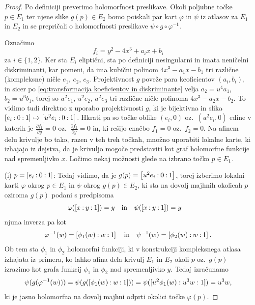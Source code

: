 \documentclass[mat1]{fmfdelo}
\numberwithin{equation}{section}
\newcommand{\inv}{^{-1}}
\newcommand{\pcoor}[1]{%
\begingroup\lccode`~=`: \lowercase{\endgroup
\edef~}{\mathbin{\mathchar\the\mathcode`:}\nobreak}%
\left[%
\begingroup
\mathcode`:=\string"8000
#1%
\endgroup
\right]%
}
\newcommand{\pdv}[2][]{\frac{\partial#1}{\partial#2}}
\newcommand{\oz}{oz.\ }
\theoremstyle{definition}
\begin{document}
\begin{proof}
    Po definiciji preverimo holomorfnost preslikave. Okoli poljubne točke $p \in E_1$ ter njene slike $g(p) \in E_2$ bomo poiskali par kart $\varphi$ in $\psi$ iz atlasov za $E_1$ in $E_2$ in se prepričali o holomorfnosti preslikave $\psi \circ g \circ \varphi\inv$. 
    
    Označimo 
    \[
        f_i = y^2 - 4x^3 + a_ix + b_i
    \]
    za $i \in \{1,2\}$.
    Ker sta $E_i$ eliptični, sta po definiciji nesingularni in imata neničelni diskriminanti, kar pomeni, da ima kubični polinom $4x^3 - a_1x - b_1$ tri različne (kompleksne) ničle $e_1$, $e_2$, $e_3$. Projektivnost $g$ poveže para keoficientov $(a_i, b_i)$, in sicer po \eqref{eq:transformacija koeficientov in diskriminante} velja $a_2 = u^4 a_1$, $b_2 = u^6 b_1$, torej so $u^2e_1$, $u^2e_2$, $u^2e_3$ tri različne ničle polinoma $4x^3 - a_2x - b_2$. To vidimo tudi direktno z uporabo projektivnosti $g$, ki je bijektivna in slika $\pcoor{e_i : 0 : 1} \mapsto \pcoor{u^2 e_i : 0 : 1}$. Hkrati pa so točke oblike $(e_i, 0)$ \oz $(u^2 e_i, 0)$ edine v katerih je $\pdv[f_1]{y} = 0$ \oz $\pdv[f_2]{y} = 0$ in, ki rešijo enačbo $f_1 = 0$ \oz $f_2 = 0$. Na afinem delu krivulje bo tako, razen v teh treh točkah, množno uporabiti lokalne karte, ki izhajajo iz dejstva, da je krivuljo mogoče predstaviti kot graf holomorfne funkcije nad spremenljivko $x$. Ločimo nekaj možnosti glede na izbrano točko $p \in E_1$.

        (i) $p = \pcoor{e_i : 0 : 1}$: Tedaj vidimo, da je $g(p) = \pcoor{u^2 e_i : 0 : 1}$, torej izberimo lokalni karti $\varphi$ okrog $p \in E_1$ in $\psi$ okrog $g(p) \in E_2$, ki sta na dovolj majhnih okolicah $p$ oziroma $g(p)$ podani s predpisoma 
        \[
            \varphi(\pcoor{x : y : 1}) = y \quad \text{in} \quad
            \psi(\pcoor{x : y : 1}) = y \quad  
        \] 
        njuna inverza pa kot 
        \[
            \varphi\inv(w) = \pcoor{\phi_1(w) : w : 1} \quad \text{in} \quad
            \psi\inv(w) = \pcoor{\phi_2(w) : w : 1}.
        \]
        Ob tem sta $\phi_1$ in $\phi_2$ holomorfni funkciji, ki v konstrukciji kompleksnega atlasa izhajata iz primera, ko lahko afina dela krivulj $E_1$ in $E_2$ okoli $p$ \oz $g(p)$ izrazimo kot grafa funkcij $\phi_1$ in $\phi_2$ nad spremenljivko $y$. Tedaj izračunamo
        \[
            \psi(g(\varphi\inv(w))) = 
            \psi(g(\pcoor{\phi_1(w) : w : 1})) = 
            \psi([u^2\phi_1(w) : u^3w : 1]) = 
            u^3w,
        \]
        ki je jasno holomorfna na dovolj majhni odprti okolici točke $\varphi(p)$. 


\end{proof}
\end{document}
